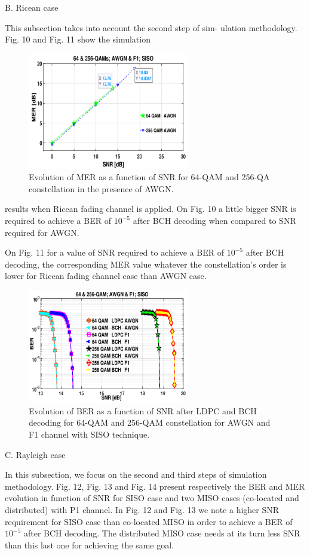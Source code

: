 \documentclass[10pt, conference]{IEEEtran}
\begin{document}
{\begin{adjustwidth}{0cm}{0cm}
    \textmd{ B. Ricean case}
\end{adjustwidth}

This subsection takes into account the second step of sim-
ulation methodology. Fig. 10 and Fig. 11 show the simulation

\begin{figure}[!htbp]
\centering
\includegraphics[width=7cm]{cap2.png}
\caption{
  \textup{{\small Evolution of MER as a function of SNR for 64-QAM and 256-QA constellation in the presence of AWGN.}}}
\end{figure}
  
\noindent results when Ricean fading channel is applied. On Fig. 10 a
little bigger SNR is required to achieve a BER of $10^{-5}$ after
BCH decoding when compared to SNR required for AWGN.

On Fig. 11 for a value of SNR required to achieve a BER
of $10^{-5}$ after BCH decoding, the corresponding MER value
whatever the constellation’s order is lower for Ricean fading
channel case than AWGN case.

\begin{figure}[!htbp]
\centering
\includegraphics[width=7cm]{cap3.png}
\caption{
 \normalsize{Evolution of BER as a function of SNR after LDPC and BCH
decoding for 64-QAM and 256-QAM constellation for AWGN and F1 channel
with SISO technique.}}
\end{figure}



\begin{adjustwidth}{0cm}{0cm}
    \textmd{ C. Rayleigh case}
\end{adjustwidth}


In this subsection, we focus on the second and third steps
of simulation methodology. Fig. 12, Fig. 13 and Fig. 14
present respectively the BER and MER evolution in function
of SNR for SISO case and two MISO cases (co-located and
distributed) with P1 channel. In Fig. 12 and Fig. 13 we note a
higher SNR requirement for SISO case than co-located MISO
in order to achieve a BER of $10^{-5}$ after BCH decoding. The
distributed MISO case needs at its turn less SNR than this last
one for achieving the same goal.
}
\end{document}
